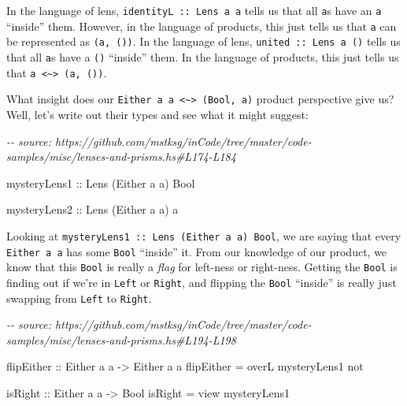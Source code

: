 \documentclass[]{article}
\newenvironment{Shaded}{}{}
\newcommand{\CommentTok}[1]{\textcolor[rgb]{0.38,0.63,0.69}{\textit{#1}}}
\newcommand{\DataTypeTok}[1]{\textcolor[rgb]{0.56,0.13,0.00}{#1}}
\newcommand{\FunctionTok}[1]{\textcolor[rgb]{0.02,0.16,0.49}{#1}}
\newcommand{\NormalTok}[1]{#1}
\newcommand{\OtherTok}[1]{\textcolor[rgb]{0.00,0.44,0.13}{#1}}
\begin{document}
In the language of lens, \texttt{identityL\ ::\ Lens\textquotesingle{}\ a\ a}
tells us that all \texttt{a}s have an \texttt{a} ``inside'' them. However, in
the language of products, this just tells us that \texttt{a} can be represented
as \texttt{(a,\ ())}. In the language of lens,
\texttt{united\ ::\ Lens\textquotesingle{}\ a\ ()} tells us that all \texttt{a}s
have a \texttt{()} ``inside'' them. In the language of products, this just tells
us that \texttt{a\ \textless{}\textasciitilde{}\textgreater{}\ (a,\ ())}.

What insight does our
\texttt{Either\ a\ a\ \textless{}\textasciitilde{}\textgreater{}\ (Bool,\ a)}
product perspective give us? Well, let's write out their types and see what it
might suggest:

\begin{Shaded}
\begin{Highlighting}[]
\CommentTok{{-}{-} source: https://github.com/mstksg/inCode/tree/master/code{-}samples/misc/lenses{-}and{-}prisms.hs\#L174{-}L184}

\OtherTok{mysteryLens1 ::} \DataTypeTok{Lens\textquotesingle{}}\NormalTok{ (}\DataTypeTok{Either}\NormalTok{ a a) }\DataTypeTok{Bool}

\OtherTok{mysteryLens2 ::} \DataTypeTok{Lens\textquotesingle{}}\NormalTok{ (}\DataTypeTok{Either}\NormalTok{ a a) a}
\end{Highlighting}
\end{Shaded}

Looking at
\texttt{mysteryLens1\ ::\ Lens\textquotesingle{}\ (Either\ a\ a)\ Bool}, we are
saying that every \texttt{Either\ a\ a} has some \texttt{Bool} ``inside'' it.
From our knowledge of our product, we know that this \texttt{Bool} is really a
\emph{flag} for left-ness or right-ness. Getting the \texttt{Bool} is finding
out if we're in \texttt{Left} or \texttt{Right}, and flipping the \texttt{Bool}
``inside'' is really just swapping from \texttt{Left} to \texttt{Right}.

\begin{Shaded}
\begin{Highlighting}[]
\CommentTok{{-}{-} source: https://github.com/mstksg/inCode/tree/master/code{-}samples/misc/lenses{-}and{-}prisms.hs\#L194{-}L198}

\OtherTok{flipEither ::} \DataTypeTok{Either}\NormalTok{ a a }\OtherTok{{-}>} \DataTypeTok{Either}\NormalTok{ a a}
\NormalTok{flipEither }\OtherTok{=}\NormalTok{ overL mysteryLens1 }\FunctionTok{not}

\OtherTok{isRight ::} \DataTypeTok{Either}\NormalTok{ a a }\OtherTok{{-}>} \DataTypeTok{Bool}
\NormalTok{isRight }\OtherTok{=}\NormalTok{ view mysteryLens1}
\end{Highlighting}
\end{Shaded}
\end{document}
